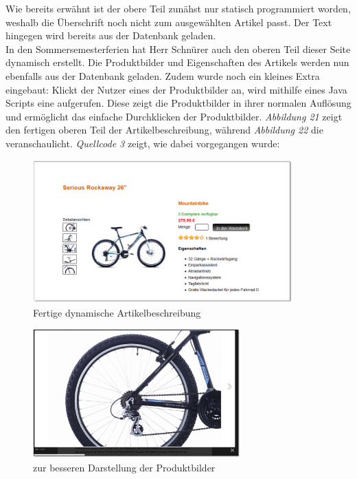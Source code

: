 Wie bereits erwähnt ist der obere Teil zunähst nur statisch programmiert worden, weshalb die Überschrift noch nicht zum ausgewählten Artikel passt. Der Text \grqq{} hingegen wird bereits aus der Datenbank geladen.
\\
In den Sommersemesterferien hat Herr Schnürer auch den oberen Teil dieser Seite dynamisch erstellt. Die Produktbilder und Eigenschaften des Artikels werden nun ebenfalls aus der Datenbank geladen. Zudem wurde noch ein kleines Extra eingebaut: Klickt der Nutzer eines der Produktbilder an, wird mithilfe eines Java Scripts eine \grqq{} aufgerufen. Diese zeigt die Produktbilder in ihrer normalen Auflösung und ermöglicht das einfache Durchklicken der Produktbilder. \textit{Abbildung 21} zeigt den fertigen oberen Teil der Artikelbeschreibung, während \textit{Abbildung 22} die \grqq{} veranschaulicht. \textit{Quellcode 3} zeigt, wie dabei vorgegangen wurde:

\begin{figure}[H]
\begin{center}
\includegraphics[width=10cm]{Bilder/Abbildung12-DynamischeDetailierteArtikelbeschreibungFertig.png}
\end{center}
\caption{Fertige dynamische Artikelbeschreibung}
\label{Abbildung12-Fertige dynamische Artikelbeschreibung}
\end{figure}

\begin{figure}[H]
\begin{center}
\includegraphics[width=8cm]{Bilder/Abbildung13-Lightbox.png}
\end{center}
\caption{\grqq{} zur besseren Darstellung der Produktbilder}
\label{Abbildung13-"Lightbox" zur besseren Darstellung der Produktbilder}
\end{figure}


